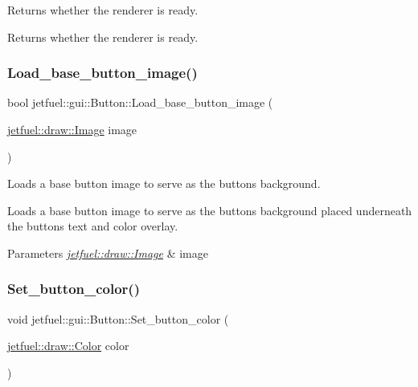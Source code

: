 Returns whether the renderer is ready. 

Returns whether the renderer is ready. \mbox{\label{classjetfuel_1_1gui_1_1Button_a2c9b05aeec9661440c2bde16c6bdd791}} 
\subsubsection{\texorpdfstring{Load\+\_\+base\+\_\+button\+\_\+image()}{Load\_base\_button\_image()}}
{\footnotesize\ttfamily bool jetfuel\+::gui\+::\+Button\+::\+Load\+\_\+base\+\_\+button\+\_\+image (\begin{DoxyParamCaption}\item[{\hyperlink{classjetfuel_1_1draw_1_1Image}{jetfuel\+::draw\+::\+Image}}]{image }\end{DoxyParamCaption})\hspace{0.3cm}{\ttfamily [inline]}}



Loads a base button image to serve as the button\textquotesingle{}s background. 

Loads a base button image to serve as the button\textquotesingle{}s background placed underneath the button\textquotesingle{}s text and color overlay.


\begin{DoxyParams}{Parameters}
{\em \hyperlink{classjetfuel_1_1draw_1_1Image}{jetfuel\+::draw\+::\+Image}} & image \\
\hline
\end{DoxyParams}
\mbox{\label{classjetfuel_1_1gui_1_1Button_a1d40cbd21c0c64b0a9c59b598536cce1}} 
\subsubsection{\texorpdfstring{Set\+\_\+button\+\_\+color()}{Set\_button\_color()}}
{\footnotesize\ttfamily void jetfuel\+::gui\+::\+Button\+::\+Set\+\_\+button\+\_\+color (\begin{DoxyParamCaption}\item[{\hyperlink{classjetfuel_1_1draw_1_1Color}{jetfuel\+::draw\+::\+Color}}]{color }\end{DoxyParamCaption})}



